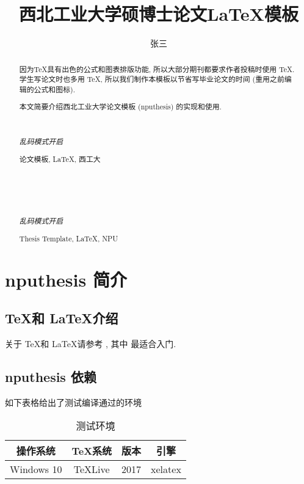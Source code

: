 \documentclass[twoside,UTF8,phd]{nputhesis}
\title[\LaTeX\ Template for Thesis of NPU]{西北工业大学硕博士论文\LaTeX 模板}
\author[San Zhang]{张三}
\theoremstyle{plain}
\begin{document}
\makecover  %
\frontmatter

\begin{abstract}  
    因为\TeX 具有出色的公式和图表排版功能, 所以大部分期刊都要求作者投稿时使用
    \TeX. 学生写论文时也多用 \TeX, 所以我们制作本模板以节省写毕业论文的时间 
    (重用之前编辑的公式和图标).

    本文简要介绍西北工业大学论文模板 (nputhesis) 的实现和使用.

    { %
        \noindent\hrulefill\\
        {\centerline {\it 乱码模式开启}}
        \noindent\hrulefill
    }
    \begin{keywords}
        论文模板, \LaTeX, 西工大 
    \end{keywords}
\end{abstract}

\begin{Abstract}

    { %
        \noindent\hrulefill\\
        {\centerline {\it 乱码模式开启}}
        \noindent\hrulefill
    }
    \begin{Keywords}
        Thesis Template, \LaTeX, NPU
    \end{Keywords}
\end{Abstract}

\tableofcontents 

\mainmatter  %
\chapter{nputhesis 简介}
\section{\TeX 和 \LaTeX 介绍}
关于 \TeX 和 \LaTeX 请参考 \cite{Knuth1986,Lamport1994,Liu2013}, 其中 \cite{Liu2013} 最适合入门.  

\section{nputhesis 依赖}
如下表格给出了测试编译通过的环境
\begin{table}[h]
  \caption{测试环境\cite{Liu2013}}
    \centering
    \begin{tabular}{cccc}
        \toprule
        操作系统    & \TeX 系统   & 版本  & 引擎\\
        \midrule
        Windows 10  & TeXLive     & 2017  & xelatex\\
        \bottomrule
    \end{tabular}
\end{table}
\end{document}
